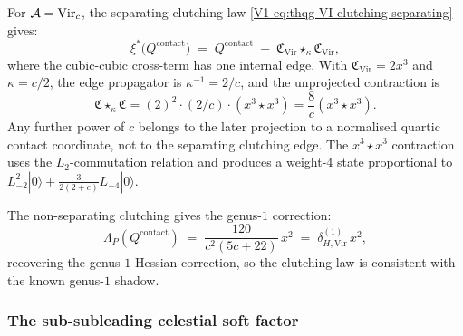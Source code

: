\begin{computation}
For $\mathcal{A} = \mathrm{Vir}_c$, the separating clutching law
\eqref{V1-eq:thqg-VI-clutching-separating} gives:
\begin{equation}%
\xi^*\bigl(Q^{\mathrm{contact}}\bigr)
\;=\;
Q^{\mathrm{contact}}
\;+\;
\mathfrak{C}_{\mathrm{Vir}} \star_\kappa
\mathfrak{C}_{\mathrm{Vir}},
\end{equation}
where the cubic-cubic cross-term has one internal edge. With
$\mathfrak{C}_{\mathrm{Vir}}=2x^3$ and $\kappa=c/2$, the edge
propagator is $\kappa^{-1}=2/c$, and the unprojected contraction is
\[
\mathfrak{C} \star_\kappa \mathfrak{C}
= (2)^2 \cdot (2/c) \cdot (x^3 \star x^3)
= \frac{8}{c}(x^3 \star x^3).
\]
Any further power of \(c\) belongs to the later projection to a
normalised quartic contact coordinate, not to the separating clutching
edge.
The $x^3 \star x^3$ contraction uses the $L_2$-commutation relation
and produces a weight-$4$ state proportional to
$L_{-2}^2|0\rangle + \tfrac{3}{2(2+c)}L_{-4}|0\rangle$.

The non-separating clutching gives the genus-$1$ correction:
\begin{equation}%
\Lambda_P(Q^{\mathrm{contact}})
\;=\;
\frac{120}{c^2(5c + 22)}\,x^2
\;=\;
\delta_{H,\mathrm{Vir}}^{(1)}\,x^2,
\end{equation}
recovering the genus-$1$ Hessian correction, so the clutching law is consistent with the known genus-$1$
shadow.
\end{computation}

\subsubsection{The sub-subleading celestial soft factor}

